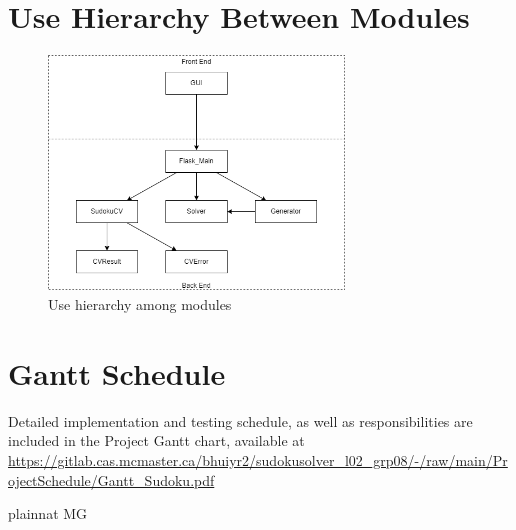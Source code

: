 \documentclass[12pt, titlepage]{article}
\begin{document}
\section{Use Hierarchy Between Modules} \label{SecUse}

\begin{figure}[H]
\centering
\includegraphics[width=0.7\textwidth]{useHierarchy}
\caption{Use hierarchy among modules}
\label{FigUH}
\end{figure}

\section{Gantt Schedule} \label{SecGantt}
Detailed implementation and testing schedule, as well as responsibilities are included in the Project Gantt chart, available at  \url{https://gitlab.cas.mcmaster.ca/bhuiyr2/sudokusolver_l02_grp08/-/raw/main/ProjectSchedule/Gantt_Sudoku.pdf}


 {plainnat}
 {MG}
\end{document}
